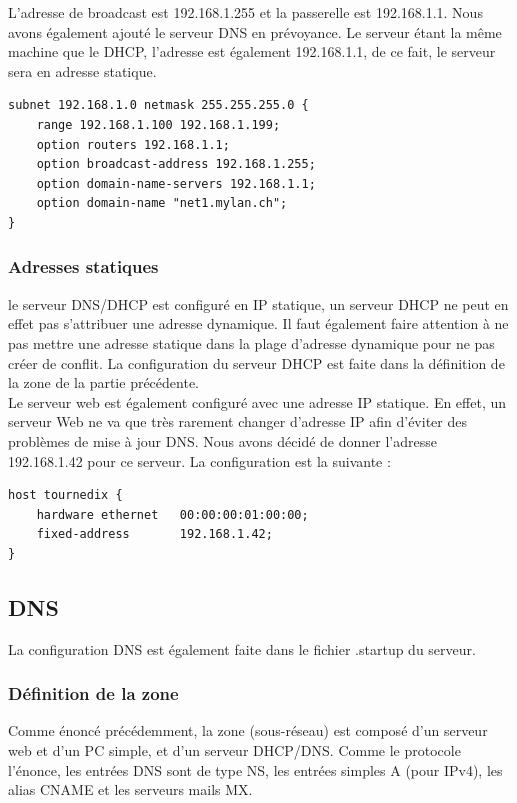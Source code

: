 \documentclass{article}
\begin{document}
L'adresse de broadcast est 192.168.1.255 et la passerelle est 192.168.1.1. Nous avons également ajouté le serveur DNS en prévoyance. Le serveur étant la même machine que le DHCP, l'adresse est également 192.168.1.1, de ce fait, le serveur sera en adresse statique.\\

\begin{lstlisting}
subnet 192.168.1.0 netmask 255.255.255.0 {
	range 192.168.1.100 192.168.1.199;
	option routers 192.168.1.1;
	option broadcast-address 192.168.1.255;
	option domain-name-servers 192.168.1.1;
	option domain-name "net1.mylan.ch";
}
\end{lstlisting}


\subsubsection{Adresses statiques}
le serveur DNS/DHCP est configuré en IP statique, un serveur DHCP ne peut en effet pas s'attribuer une adresse dynamique. Il faut également faire attention à ne pas mettre une adresse statique dans la plage d'adresse dynamique pour ne pas créer de conflit. La configuration du serveur DHCP est faite dans la définition de la zone de la partie précédente.\\

Le serveur web est également configuré avec une adresse IP statique. En effet, un serveur Web ne va que très rarement changer d'adresse IP afin d'éviter des problèmes de mise à jour DNS. Nous avons décidé de donner l'adresse 192.168.1.42 pour ce serveur. La configuration est la suivante : \\

\begin{lstlisting}
host tournedix {
	hardware ethernet	00:00:00:01:00:00;
	fixed-address		192.168.1.42;
}
\end{lstlisting}

\subsection{DNS}
La configuration DNS est également faite dans le fichier .startup du serveur.

\subsubsection{Définition de la zone}
Comme énoncé précédemment, la zone (sous-réseau) est composé d'un serveur web et d'un PC simple, et d'un serveur DHCP/DNS. Comme le protocole l'énonce, les entrées DNS sont de type NS, les entrées simples A (pour IPv4), les alias CNAME et les serveurs mails MX. \cite{cours}\\
\end{document}
